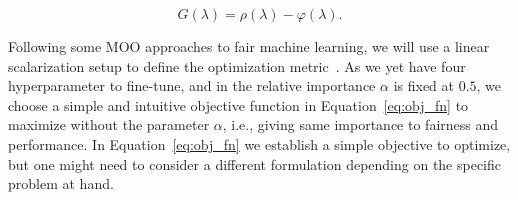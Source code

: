 \begin{equation} \label{eq:obj_fn}
    G(\lambda) = \rho(\lambda) - \varphi(\lambda).
\end{equation}

Following some MOO approaches to fair machine learning, we will use a linear scalarization setup to define the optimization metric~\citep{Schmucker2020,Petrovic2021}. As we yet have four hyperparameter to fine-tune, and in \cite{Cruz2021} the relative importance $\alpha$ is fixed at $0.5$, we choose a simple and intuitive objective function in Equation~\ref{eq:obj_fn} to maximize without the parameter $\alpha$, i.e., giving same importance to fairness and performance. In Equation~\ref{eq:obj_fn} we establish a simple objective to optimize, but one might need to consider a different formulation depending on the specific problem at hand.
